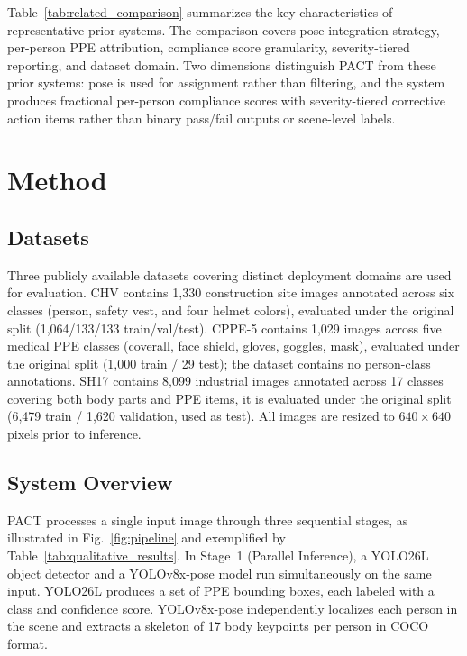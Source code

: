 \documentclass[conference,a4paper]{IEEEtran}
\begin{document}
Table~\ref{tab:related_comparison} summarizes the key characteristics of representative prior systems. The comparison covers pose integration strategy, per-person PPE attribution, compliance score granularity, severity-tiered reporting, and dataset domain. Two dimensions distinguish PACT from these prior systems: pose is used for assignment rather than filtering, and the system produces fractional per-person compliance scores with severity-tiered corrective action items rather than binary pass/fail outputs or scene-level labels.



\section{Method}


\subsection{Datasets}
Three publicly available datasets covering distinct deployment domains are used for evaluation. CHV \cite{ref5} contains 1,330 construction site images annotated across six classes (person, safety vest, and four helmet colors), evaluated under the original split (1,064/133/133 train/val/test). CPPE-5 \cite{ref1} contains 1,029 images across five medical PPE classes (coverall, face shield, gloves, goggles, mask), evaluated under the original split (1,000 train / 29 test); the dataset contains no person-class annotations. SH17 \cite{ref2} contains 8,099 industrial images annotated across 17 classes covering both body parts and PPE items, it is evaluated under the original split (6,479 train / 1,620 validation, used as test). All images are resized to $640 \times 640$ pixels prior to inference.


\subsection{System Overview}
PACT processes a single input image through three sequential stages, as illustrated in Fig.~\ref{fig:pipeline} and exemplified by Table~\ref{tab:qualitative_results}. In Stage~1 (Parallel Inference), a YOLO26L object detector and a YOLOv8x-pose model run simultaneously on the same input. YOLO26L produces a set of PPE bounding boxes, each labeled with a class and confidence score. YOLOv8x-pose independently localizes each person in the scene and extracts a skeleton of 17 body keypoints per person in COCO format.
\end{document}
